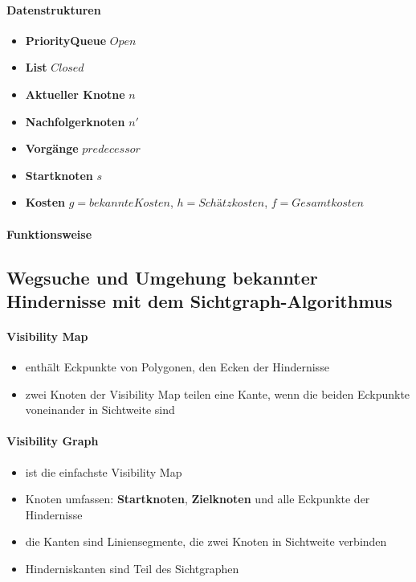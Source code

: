 \paragraph{Datenstrukturen}
\begin{itemize}
	\item \textbf{PriorityQueue} $Open$
	\item \textbf{List} $Closed$
	\item \textbf{Aktueller Knotne} $n$
	\item \textbf{Nachfolgerknoten} $n'$
	\item \textbf{Vorgänge} $predecessor$
	\item \textbf{Startknoten} $s$
	\item \textbf{Kosten} $g = bekannte Kosten$, $h = Schätzkosten$, $f = Gesamtkosten$
\end{itemize}
\paragraph{Funktionsweise}
\subsection{Wegsuche und Umgehung bekannter Hindernisse mit dem Sichtgraph-Algorithmus}
\paragraph{Visibility Map}
\begin{itemize}
	\item enthält Eckpunkte von Polygonen, den Ecken der Hindernisse
	\item zwei Knoten der Visibility Map teilen eine Kante, wenn die beiden Eckpunkte voneinander in Sichtweite sind
\end{itemize}
\paragraph{Visibility Graph}
\begin{itemize}
	\item ist die einfachste Visibility Map
	\item Knoten umfassen: \textbf{Startknoten}, \textbf{Zielknoten} und alle Eckpunkte der Hindernisse
	\item die Kanten sind Liniensegmente, die zwei Knoten in Sichtweite verbinden
	\item Hinderniskanten sind Teil des Sichtgraphen
\end{itemize}
\newpage
